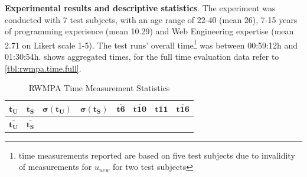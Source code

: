 \textbf{Experimental results and descriptive statistics}.
The experiment was conducted with 7 test subjects, with an age range of 22-40 (mean 26), 7-15 years of programming experience (mean 10.29) and \gls{Web Engineering} expertise (mean 2.71 on Likert scale 1-5).
The test runs' overall time\footnote{time measurements reported are based on five test subjects due to invalidity of measurements for \(u_{new}\) for two test subjects} was between 00:59:12h and 01:30:54h.
 shows aggregated times, for the full time evaluation data  refer to \cref{tbl:rwmpa.time.full}.
\begin{longtable}[hbt]{@{}llllllll}
\caption{\label{tbl:rwmpa-timeresults}RWMPA Time Measurement Statistics}\tabularnewline
\toprule
\begin{minipage}[b]{0.07\columnwidth}\raggedright
\(\bm{\overline{t_U}}\)\strut
\end{minipage} & \begin{minipage}[b]{0.07\columnwidth}\raggedright
\(\bm{\overline{t_S}}\)\strut
\end{minipage} & \begin{minipage}[b]{0.07\columnwidth}\raggedright
\(\bm{\sigma(t_U)}\)\strut
\end{minipage} & \begin{minipage}[b]{0.07\columnwidth}\raggedright
\(\bm{\sigma(t_S)}\)\strut
\end{minipage} & \begin{minipage}[b]{0.07\columnwidth}\raggedright
\(\bm{\overline{t6}}\)\strut
\end{minipage} & \begin{minipage}[b]{0.07\columnwidth}\raggedright
\(\bm{\overline{t10}}\)\strut
\end{minipage} & \begin{minipage}[b]{0.07\columnwidth}\raggedright
\(\bm{\overline{t11}}\)\strut
\end{minipage} & \begin{minipage}[b]{0.07\columnwidth}\raggedright
\(\bm{\overline{t16}}\)\strut
\end{minipage}\tabularnewline
\midrule
\endfirsthead
\toprule
\begin{minipage}[b]{0.07\columnwidth}\raggedright
\(\bm{\overline{t_U}}\)\strut
\end{minipage} & \begin{minipage}[b]{0.07\columnwidth}\raggedright
\(\bm{\overline{t_S}}\)\strut
\end{minipage} & \begin{minipage}[b]{0.07\columnwidth}\raggedright

\end{minipage}
\end{longtable}

